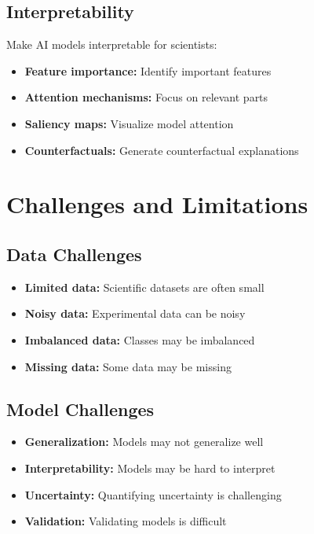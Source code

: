 \subsection{Interpretability}

Make AI models interpretable for scientists:
\begin{itemize}
    \item \textbf{Feature importance:} Identify important features
    \item \textbf{Attention mechanisms:} Focus on relevant parts
    \item \textbf{Saliency maps:} Visualize model attention
    \item \textbf{Counterfactuals:} Generate counterfactual explanations
\end{itemize}

\section{Challenges and Limitations}

\subsection{Data Challenges}

\begin{itemize}
    \item \textbf{Limited data:} Scientific datasets are often small
    \item \textbf{Noisy data:} Experimental data can be noisy
    \item \textbf{Imbalanced data:} Classes may be imbalanced
    \item \textbf{Missing data:} Some data may be missing
\end{itemize}

\subsection{Model Challenges}

\begin{itemize}
    \item \textbf{Generalization:} Models may not generalize well
    \item \textbf{Interpretability:} Models may be hard to interpret
    \item \textbf{Uncertainty:} Quantifying uncertainty is challenging
    \item \textbf{Validation:} Validating models is difficult
\end{itemize}

